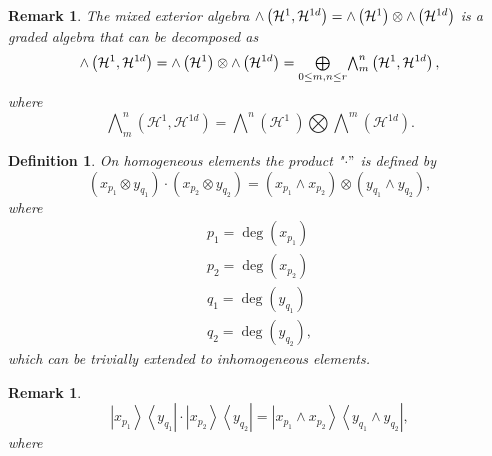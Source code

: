 \documentclass[aps,preprint]{revtex4}%
\newtheorem{definition}[theorem]{Definition}
\newtheorem{remark}[theorem]{Remark}
\begin{document}
\begin{remark}
The mixed exterior algebra ${\huge \wedge}\left(  \mathcal{H}^{1}%
,\mathcal{H}^{1d}\right)  ={\huge \wedge}\left(  \mathcal{H}^{1}\right)
\otimes{\huge \wedge}\left(  \mathcal{H}^{1d}\right)  $ is a graded algebra
that can be decomposed as
\begin{equation}
{\huge \wedge}\left(  \mathcal{H}^{1},\mathcal{H}^{1d}\right)  ={\huge \wedge
}\left(  \mathcal{H}^{1}\right)  \otimes{\huge \wedge}\left(  \mathcal{H}%
^{1d}\right)  =%
{\textstyle\bigoplus\limits_{0\leq m,n\leq r}}
{\textstyle\bigwedge\nolimits_{m}^{n}}
\left(  \mathcal{H}^{1},\mathcal{H}^{1d}\right)  ,
\end{equation}
where
\begin{equation}%
{\textstyle\bigwedge\nolimits_{m}^{n}}
\left(  \mathcal{H}^{1},\mathcal{H}^{1d}\right)  =%
{\textstyle\bigwedge\nolimits^{n}}
\left(  \mathcal{H}^{1}\ \right)
{\textstyle\bigotimes}
{\textstyle\bigwedge\nolimits^{m}}
\left(  \mathcal{H}^{1d}\right)  .
\end{equation}

\end{remark}

\begin{definition}
On homogeneous elements the product "$\cdot"$ is defined by
\begin{equation}
\left(  x_{p_{1}}\otimes y_{q_{1}}\right)  \cdot\left(  x_{p_{2}}\otimes
y_{q_{2}}\right)  =\left(  x_{p_{1}}\wedge x_{p_{2}}\right)  \otimes\left(
y_{q_{1}}\wedge y_{q_{2}}\right)  ,
\end{equation}
where
\begin{gather}
p_{1}=\deg\left(  x_{p_{1}}\right) \\
p_{2}=\deg\left(  x_{p_{2}}\right) \\
q_{1}=\deg\left(  y_{q_{1}}\right) \\
q_{2}=\deg\left(  y_{q_{2}}\right)  ,
\end{gather}
which can be trivially extended to inhomogeneous elements.
\end{definition}

\begin{remark}%
\begin{equation}
\left\vert x_{p_{1}}\right\rangle \left\langle y_{q_{1}}\right\vert
\cdot\left\vert x_{p_{2}}\right\rangle \left\langle y_{q_{2}}\right\vert
=\left\vert x_{p_{1}}\wedge x_{p_{2}}\right\rangle \left\langle y_{q_{1}%
}\wedge y_{q_{2}}\right\vert ,
\end{equation}
where
\end{remark}
\end{document}
